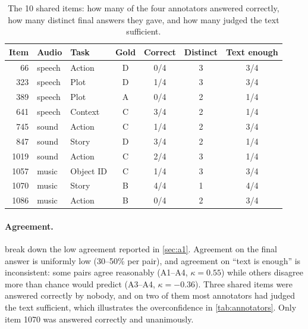 \documentclass{article}
\begin{document}
\begin{table}[h]
\caption{The 10 shared items: how many of the four annotators answered correctly, how many distinct
final answers they gave, and how many judged the text sufficient.}
\label{tab:app-shared}
\centering\small
\setlength{\tabcolsep}{4pt}
\begin{tabular}{rllcccc}
\toprule
Item & Audio & Task & Gold & Correct & Distinct & Text enough \\
\midrule
66   & speech & Action      & D & 0/4 & 3 & 3/4 \\
323  & speech & Plot        & D & 1/4 & 3 & 3/4 \\
389  & speech & Plot        & A & 0/4 & 2 & 1/4 \\
641  & speech & Context     & C & 3/4 & 2 & 1/4 \\
745  & sound  & Action      & C & 1/4 & 2 & 3/4 \\
847  & sound  & Story       & D & 3/4 & 2 & 1/4 \\
1019 & sound  & Action      & C & 2/4 & 3 & 1/4 \\
1057 & music  & Object ID   & C & 1/4 & 3 & 3/4 \\
1070 & music  & Story       & B & 4/4 & 1 & 4/4 \\
1086 & music  & Action      & B & 0/4 & 2 & 3/4 \\
\bottomrule
\end{tabular}
\end{table}

\paragraph{Agreement.}  break down the low
agreement reported in \cref{sec:a1}. Agreement on the final answer is uniformly
low (30--50\% per pair), and agreement on ``text is enough'' is inconsistent:
some pairs agree reasonably (A1--A4, $\kappa{=}0.55$) while others disagree more
than chance would predict (A3--A4, $\kappa{=}-0.36$). Three shared items were
answered correctly by nobody, and on two of them most annotators had judged the
text sufficient, which illustrates the overconfidence in \cref{tab:annotators}.
Only item 1070 was answered correctly and unanimously.
\end{document}
